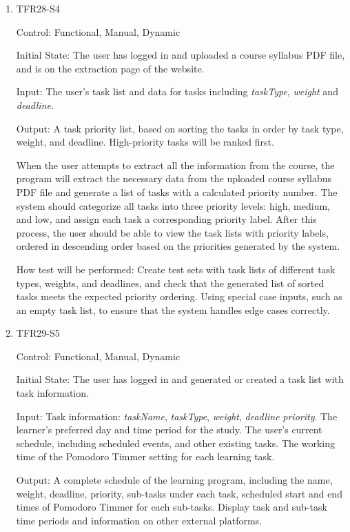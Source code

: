 \documentclass[12pt, titlepage]{article}
\begin{document}
\begin{enumerate}
\item{TFR28-S4\\}

Control: Functional, Manual, Dynamic
					
Initial State: The user has logged in and uploaded a course syllabus PDF file, and is on the extraction page of the website. 
					
Input: The user's task list and data for tasks including \textit{taskType}, \textit{weight} and \textit{deadline}.
					
Output: A task priority list, based on sorting the tasks in order by task type, weight, and deadline. High-priority tasks will be ranked first.

When the user attempts to extract all the information from the course, the program will extract the necessary data from the uploaded course syllabus PDF file and generate a list of tasks with a calculated priority number. The system should categorize all tasks into three priority levels: high, medium, and low, and assign each task a corresponding priority label. After this process, the user should be able to view the task lists with priority labels, ordered in descending order based on the priorities generated by the system.
					
How test will be performed: Create test sets with task lists of different task types, weights, and deadlines, and check that the generated list of sorted tasks meets the expected priority ordering. Using special case inputs, such as an empty task list, to ensure that the system handles edge cases correctly.

\item{TFR29-S5\\}

Control: Functional, Manual, Dynamic
					
Initial State: The user has logged in and generated or created a task list with task information.
					
Input: Task information: \textit{taskName}, \textit{taskType}, \textit{weight}, \textit{deadline} \textit{priority}. The learner's preferred day and time period for the study. The user's current schedule, including scheduled events, and other existing tasks. The working time of the Pomodoro Timmer setting for each learning task.
					
Output: A complete schedule of the learning program, including the name, weight, deadline, priority, sub-tasks under each task, scheduled start and end times of Pomodoro Timmer for each sub-tasks. Display task and sub-task time periods and information on other external platforms.


\end{enumerate}
\end{document}
